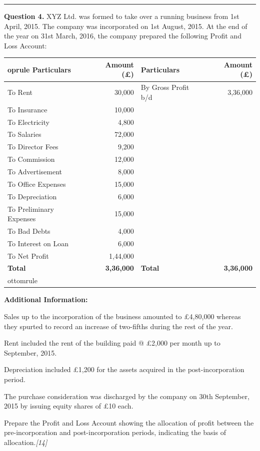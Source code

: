 \documentclass[11pt,a4paper]{article}
\newcommand{\pts}[1]{\hfill   \textit{[#1]}}
\begin{document}
\medskip\rule{\linewidth}{0.2pt}


\newpage




\noindent   \textbf{Question 4.}
XYZ Ltd. was formed to take over a running business from 1st April, 2015. The company was incorporated on 1st August, 2015. At the end of the year on 31st March, 2016, the company prepared the following Profit and Loss Account:


\begin{center}

\begin{tabular}{lr|lr}
 oprule
   \textbf{Particulars} &   \textbf{Amount (\pounds)} &   \textbf{Particulars} &   \textbf{Amount (\pounds)} \\
\midrule
To Rent & 30,000 & By Gross Profit b/d & 3,36,000 \\
To Insurance & 10,000 & & \\
To Electricity & 4,800 & & \\
To Salaries & 72,000 & & \\
To Director Fees & 9,200 & & \\
To Commission & 12,000 & & \\
To Advertisement & 8,000 & & \\
To Office Expenses & 15,000 & & \\
To Depreciation & 6,000 & & \\
To Preliminary Expenses & 15,000 & & \\
To Bad Debts & 4,000 & & \\
To Interest on Loan & 6,000 & & \\
To Net Profit & 1,44,000 & & \\
\midrule
   \textbf{Total} &   \textbf{3,36,000} &   \textbf{Total} &   \textbf{3,36,000} \\
ottomrule
\end{tabular}
\end{center}




\noindent   \textbf{Additional Information:}

\begin{parts}
  \item Sales up to the incorporation of the business amounted to \pounds 4,80,000 whereas they spurted to record an increase of two-fifths during the rest of the year.
  \item Rent included the rent of the building paid @ \pounds 2,000 per month up to September, 2015.
  \item Depreciation included \pounds 1,200 for the assets acquired in the post-incorporation period.
  \item The purchase consideration was discharged by the company on 30th September, 2015 by issuing equity shares of \pounds 10 each.
\end{parts}
Prepare the Profit and Loss Account showing the allocation of profit between the pre-incorporation and post-incorporation periods, indicating the basis of allocation.\pts{14}
\end{document}

